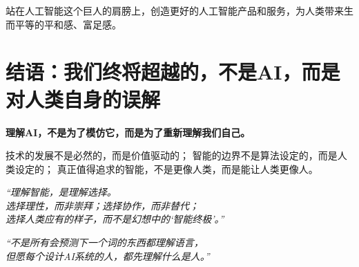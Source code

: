 站在人工智能这个巨人的肩膀上，创造更好的人工智能产品和服务，为人类带来生而平等的平和感、富足感。


\section*{结语：我们终将超越的，不是AI，而是对人类自身的误解}

\textbf{理解AI，不是为了模仿它，而是为了重新理解我们自己。}

技术的发展不是必然的，而是价值驱动的；  
智能的边界不是算法设定的，而是人类设定的；  
真正值得追求的智能，不是更像人类，而是能让人类更像人。

\begin{center}
\textit{
“理解智能，是理解选择。\\
选择理性，而非崇拜；选择协作，而非替代；\\
选择人类应有的样子，而不是幻想中的‘智能终极’。”}
\end{center}

\begin{center}
\textit{
“不是所有会预测下一个词的东西都理解语言，\\
但愿每个设计AI系统的人，都先理解什么是人。”\\
}
\end{center}

\nocite{*}
\printbibliography[heading=bibintoc, title=\ebibname]

\newpage